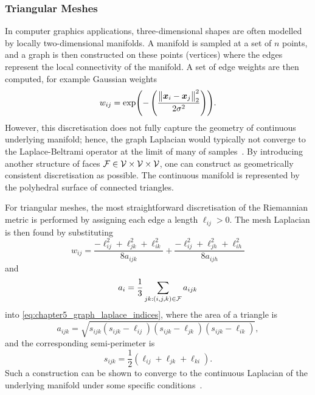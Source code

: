 \subsubsection{Triangular Meshes}

In computer graphics applications, three-dimensional shapes are often modelled by locally two-dimensional manifolds.
A manifold is sampled at a set of \(n\) points, and a graph is then constructed on these points (vertices) where the edges represent the local connectivity of the manifold.
A set of edge weights are then computed, for example Gaussian weights
%
\begin{equation}
	w_{i j}
	= \exp(-\left(\frac{{\big\lVert\vb*{x}_{i} - \vb*{x}_{j}\big\rVert}_{2}^{2}}{2\sigma^{2}}\right)).
\end{equation}
%
However, this discretisation does not fully capture the geometry of continuous underlying manifold; hence, the graph Laplacian would typically not converge to the Laplace-Beltrami operator at the limit of many of samples~\cite{Wardetzky2007}.
By introducing another structure of faces \(\mathcal{F} \in \mathcal{V} \times \mathcal{V} \times \mathcal{V}{}\), one can construct as geometrically consistent discretisation as possible.
The continuous manifold is represented by the polyhedral surface of connected triangles.

For triangular meshes, the most straightforward discretisation of the Riemannian metric is performed by assigning each edge a length \(\ell_{i j}>0\).
The mesh Laplacian is then found by substituting
%
\begin{equation}\label{eq:chapter5_mesh_laplace_weights}
	w_{i j}
	= \frac{-\ell_{i j}^{2} + \ell_{j k}^{2} + \ell_{i k}^{2}}{8 a_{i j k}}
	+ \frac{-\ell_{i j}^{2} + \ell_{j h}^{2} + \ell_{i h}^{2}}{8 a_{i j h}}
\end{equation}
%
and
%
\begin{equation}
	a_{i}
	= \frac{1}{3} \sum\limits_{j k : (i,j,k) \in \mathcal{F}} a_{i j k}
\end{equation}
%
into \cref{eq:chapter5_graph_laplace_indices}, where the area of a triangle is
%
\begin{equation}
	a_{i j k}
	= \sqrt{s_{i j k}(s_{i j k}-\ell_{i j})(s_{i j k}-\ell_{j k})(s_{i j k}-\ell_{i k})},
\end{equation}
%
and the corresponding semi-perimeter is
%
\begin{equation}
	s_{i j k}
	= \frac{1}{2}(\ell_{i j} + \ell_{j k} + \ell_{k i}).
\end{equation}
%
Such a construction can be shown to converge to the continuous Laplacian of the underlying manifold under some specific conditions~\cite{Wardetzky2008}.

